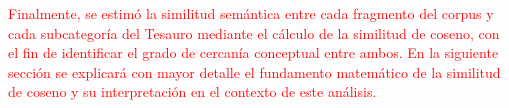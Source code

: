 \documentclass[11pt,a4paper]{article}
\begin{document}
\textcolor{red}{Finalmente, se estimó la similitud semántica entre cada fragmento del corpus y cada subcategoría del Tesauro mediante el cálculo de la similitud de coseno, con el fin de identificar el grado de cercanía conceptual entre ambos. En la siguiente sección se explicará con mayor detalle el fundamento matemático de la similitud de coseno y su interpretación en el contexto de este análisis.}	
%
%
%
%	
%	
%	
\end{document}

